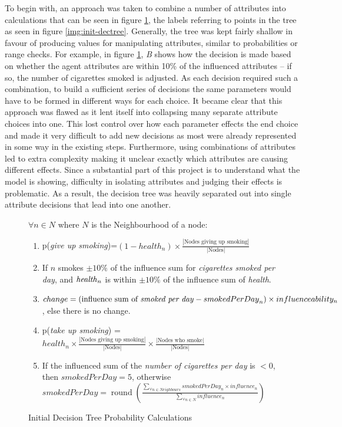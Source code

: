 \documentclass[]{report}
\begin{document}
To begin with, an approach was taken to combine a number of attributes into calculations that can be seen in figure \ref{eq:v0.9probs}, the labels referring to points in the tree as seen in figure \ref{img:init-dectree}. Generally, the tree was kept fairly shallow in favour of producing values for manipulating attributes, similar to probabilities or range checks. For example, in figure \ref{eq:v0.9probs}, \emph{B} shows how the decision is made based on whether the agent attributes are within 10\% of the influenced attributes – if so, the number of cigarettes smoked is adjusted. As each decision required such a combination, to build a sufficient series of decisions the same parameters would have to be formed in different ways for each choice. It became clear that this approach was flawed as it lent itself into collapsing many separate attribute choices into one. This lost control over how each parameter effects the end choice and made it very difficult to add new decisions as most were already represented in some way in the existing steps. Furthermore, using combinations of attributes led to extra complexity making it unclear exactly which attributes are causing different effects. Since a substantial part of this project is to understand what the model is showing, difficulty in isolating attributes and judging their effects is problematic. As a result, the decision tree was heavily separated out into single attribute decisions that lead into one another.

\begin{figure}

	$\forall n \in N$ where $N$ is the Neighbourhood of a node:
	\begin{enumerate}
		\item p(\emph{give up smoking})=$(1-health_{n}) \times \frac{|\text{Nodes giving up smoking}|}{|\text{Nodes}|}$ \\
		\item If $n$ smokes $\pm10\%$ of the influence sum for \emph{cigarettes smoked per day}, and $\text{\emph{health}}_{n}$ is within $\pm10\%$ of the influence sum of \emph{health}. \\
		\item $change = (\text{influence sum of \emph{smoked per day}} - {smokedPerDay}_{n}) \times influenceability_{n}$, else there is no change. \\
		\item p(\emph{take up smoking}) = $health_{n} \times \frac{|\text{Nodes giving up smoking}|}{|\text{Nodes}|} \times \frac{|\text{Nodes who smoke}|}{|\text{Nodes}|}$ \\
		\item If the influenced sum of the \emph{number of cigarettes per day} is $< 0$, then $smokedPerDay = 5$, otherwise \\
		$smokedPerDay = \operatorname{round}(\frac{\sum_{\forall n \in Neighbours} smokedPerDay_{n} \times influence_{n}}{\sum_{\forall n \in N} influence_{n}})$
	\end{enumerate}
	\caption{Initial Decision Tree Probability Calculations}
	\label{eq:v0.9probs}
\end{figure}
\end{document}

